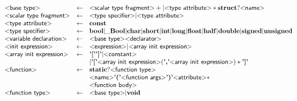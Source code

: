 \begin{figure}
\[\begin{array}{lcl}
  \text{\sf\textless base type\textgreater} & \gets & \text{\sf\textless scalar type fragment\textgreater}+
                               | \text{\sf\textless type attribute\textgreater}* \mathbf{struct}? \text{\sf\textless name\textgreater}\\


  \text{\sf\textless scalar type fragment\textgreater} & \gets & \text{\sf\textless type specifier\textgreater} | \text{\sf\textless type attribute\textgreater} \\

  \text{\sf\textless type attribute\textgreater} & \gets & \mathbf{const} \\

  \text{\sf\textless type specifier\textgreater} & \gets & \mathbf{bool}
                                    | \mathbf{\_Bool}
                                    | \mathbf{char}
                                    | \mathbf{short}
                                    | \mathbf{int}
                                    | \mathbf{long}
                                    | \mathbf{float}
                                    | \mathbf{half}
                                    | \mathbf{double}
                                    | \mathbf{signed}
                                    | \mathbf{unsigned}
  \\

  \text{\sf\textless variable declaration\textgreater} & \gets & \text{\sf\textless base type\textgreater} \text{\sf\textless declarator\textgreater}
  \\

  \text{\sf\textless init expression\textgreater} & \gets & \text{\sf\textless expression\textgreater} | \text{\sf\textless array init expression\textgreater} \\

  \text{\sf\textless array init expression\textgreater} & \gets & \text{\bf'['}\text{\bf']'}
                                           |\text{\sf\textless constant\textgreater}\\
  & &                                      | \text{\bf'['} \text{\sf\textless array init expression\textgreater}
                                                        (\text{\bf','} \text{\sf\textless array init expression\textgreater})*
                                             \text{\bf']'}
  \\
  \text{\sf\textless function\textgreater} & \gets & \mathbf{static}? \text{\sf\textless function type\textgreater} \\
                                & & \text{\sf\textless name\textgreater}
                                \text{\bf'('} \text{\sf\textless function args\textgreater} \text{\bf')'} \text{\sf\textless attribute\textgreater}*\\
                                & & \text{\sf\textless function body\textgreater}
  \\
  \text{\sf\textless function type\textgreater} & \gets & \text{\sf\textless base type\textgreater} | \mathbf{void} \\


\end{array}\]
\end{figure}
